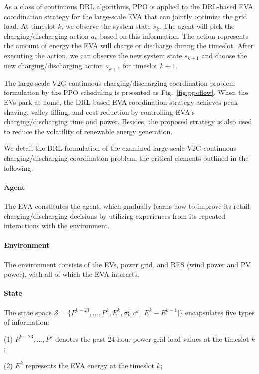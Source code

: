 \documentclass[journal,twoside]{IEEEtran}
\begin{document}
As a class of continuous DRL algorithms, PPO is applied to the DRL-based EVA coordination strategy for the large-scale EVA that can jointly optimize the grid load. At timeslot $k$, we observe the system state $s_k$. The agent will pick the charging/discharging action $a_k$ based on this information. The action represents the amount of energy the EVA will charge or discharge during the timeslot. After executing the action, we can observe the new system state $s_{k+1}$ and choose the new charging/discharging action $a_{k+1}$ for timeslot $k+1$.

The large-scale V2G continuous charging/discharging coordination problem formulation by the PPO scheduling is presented as Fig.~\ref{fig:ppoflow}. When the EVs park at home, the DRL-based EVA coordination strategy achieves peak shaving, valley filling, and cost reduction by controlling EVA's charging/discharging time and power. Besides, the proposed strategy is also used to reduce the volatility of renewable energy generation.

We detail the DRL formulation of the examined large-scale V2G continuous charging/discharging coordination problem, the critical elements outlined in the following.

\paragraph{Agent} The EVA constitutes the agent, which gradually learns how to improve its retail charging/discharging decisions by utilizing experiences from its repeated interactions with the environment.

\paragraph{Environment} The environment consists of the EVs, power grid, and RES (wind power and PV power), with all of which the EVA interacts.

\paragraph{State}

The state space $\mathcal{S}=\{P^{k-23}, ..., P^k, E^k, {\sigma^{2}_k}, c^k, {\lvert E^k-E^{k-1} \rvert} \}$ encapsulates five types of information:

(1) $P^{k-23}, ..., P^k$ denotes the past 24-hour power grid load values at the timeslot $k$;

(2) $E^k$ represents the EVA energy at the timeslot $k$;
\end{document}
